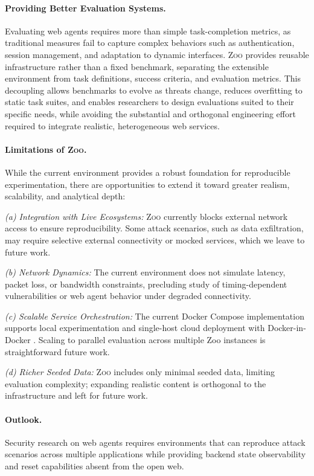 \documentclass{article} %
\newcommand{\zoo}{\textsc{Zoo}}
\begin{document}
\paragraph{Providing Better Evaluation Systems.}
Evaluating web agents requires more than simple task-completion metrics, as traditional measures fail to capture complex behaviors such as authentication, session management, and adaptation to dynamic interfaces.
\zoo{} provides reusable infrastructure rather than a fixed benchmark, separating the extensible environment from task definitions, success criteria, and evaluation metrics.
This decoupling allows benchmarks to evolve as threats change, reduces overfitting to static task suites, and enables researchers to design evaluations suited to their specific needs, while avoiding the substantial and orthogonal engineering effort required to integrate realistic, heterogeneous web services.

\paragraph{Limitations of \zoo{}.}
While the current environment provides a robust foundation for reproducible experimentation, there are opportunities to extend it toward greater realism, scalability, and analytical depth:

\textit{(a) Integration with Live Ecosystems:} \zoo{} currently blocks external network access to ensure reproducibility. Some attack scenarios, such as data exfiltration, may require selective external connectivity or mocked services, which we leave to future work.

\textit{(b) Network Dynamics:} The current environment does not simulate latency, packet loss, or bandwidth constraints, precluding study of timing-dependent vulnerabilities or web agent behavior under degraded connectivity.

\textit{(c) Scalable Service Orchestration:} The current Docker Compose implementation supports local experimentation and single-host cloud deployment with Docker-in-Docker \citep{docker_in_docker}.
Scaling to parallel evaluation across multiple Zoo instances is straightforward future work.

\textit{(d) Richer Seeded Data:} \zoo{} includes only minimal seeded data, limiting evaluation complexity; expanding realistic content is orthogonal to the infrastructure and left for future work.

\paragraph{Outlook.}
Security research on web agents requires environments that can reproduce attack scenarios across multiple applications while providing backend state observability and reset capabilities absent from the open web.
\end{document}
